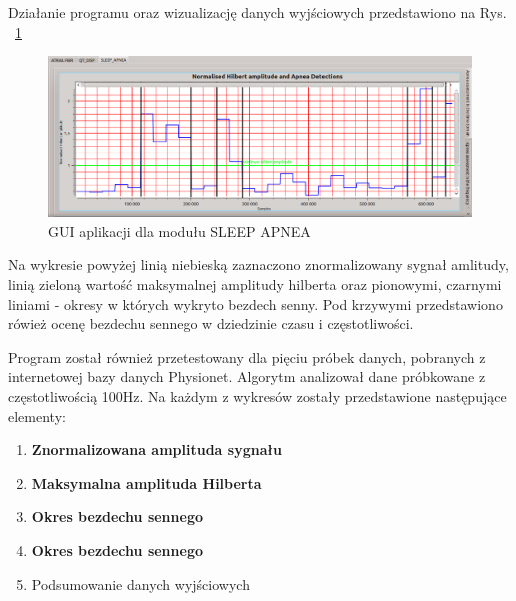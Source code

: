 Działanie programu oraz wizualizację danych wyjściowych przedstawiono na Rys. ~\ref{fig:gui1}
\begin{figure}[H]
\centering
\includegraphics[scale=0.4]{SLEEP_APNEA/img/gui1.png}
\caption{GUI aplikacji dla modułu SLEEP APNEA}
\label{fig:gui1}
\end{figure} 
Na wykresie powyżej linią niebieską zaznaczono znormalizowany sygnał amlitudy, linią zieloną wartość maksymalnej amplitudy hilberta oraz pionowymi, czarnymi liniami - okresy w których wykryto bezdech senny. Pod krzywymi przedstawiono rówież ocenę bezdechu sennego w dziedzinie czasu i częstotliwości.

Program został również przetestowany dla pięciu próbek danych, pobranych z internetowej bazy danych Physionet. Algorytm analizował dane próbkowane z częstotliwością 100Hz.
Na każdym z wykresów zostały przedstawione następujące elementy:
\begin{enumerate}
 \item \textbf {\color{blue}Znormalizowana amplituda sygnału}
 \item \textbf {\color{black}Maksymalna amplituda Hilberta}
 \item \textbf {\color{red}Okres bezdechu sennego}
 \item \textbf {\color{green}Okres bezdechu sennego}
 \item {Podsumowanie danych wyjściowych}
\end{enumerate}

